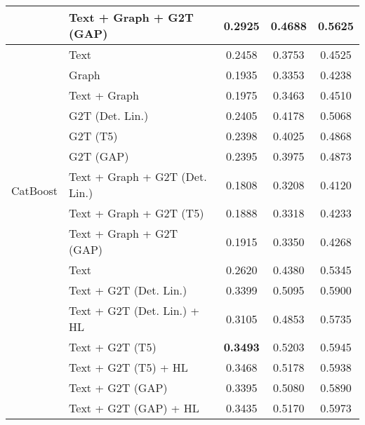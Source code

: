 \begin{table}[htbp]
\begin{tabular}{l p{5cm} c c c}
        & Text + Graph + G2T (GAP) & 0.2925 & 0.4688 & 0.5625 \\
        \midrule
        \multirow{12}{*}{CatBoost} & Text & 0.2458 & 0.3753 & 0.4525 \\
        & Graph & 0.1935 & 0.3353 & 0.4238 \\
        & Text + Graph & 0.1975 & 0.3463 & 0.4510 \\
        & G2T (Det. Lin.) & 0.2405 & 0.4178 & 0.5068 \\
        & G2T (T5) & 0.2398 & 0.4025 & 0.4868 \\
        & G2T (GAP) & 0.2395 & 0.3975 & 0.4873 \\
        & Text + Graph + G2T (Det. Lin.) & 0.1808 & 0.3208 & 0.4120 \\
        & Text + Graph + G2T (T5) & 0.1888 & 0.3318 & 0.4233 \\
        & Text + Graph + G2T (GAP) & 0.1915 & 0.3350 & 0.4268 \\
        \midrule
        \multirow{10}{*}{MPNet} & Text & 0.2620 & 0.4380 & 0.5345 \\
        & Text + G2T (Det. Lin.) & 0.3399 & 0.5095 & 0.5900 \\
        & Text + G2T (Det. Lin.) + HL & 0.3105 & 0.4853 & 0.5735 \\
        & Text + G2T (T5) & \textbf{0.3493} & 0.5203 & 0.5945 \\
        & Text + G2T (T5) + HL & 0.3468 & 0.5178 & 0.5938 \\
        & Text + G2T (GAP) & 0.3395 & 0.5080 & 0.5890 \\
        & Text + G2T (GAP) + HL & 0.3435 & 0.5170 & 0.5973 \\
        \bottomrule
    \end{tabular}
\end{table}

